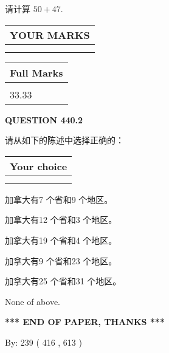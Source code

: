 \documentclass{ctexart}
\begin{document}
  
 
请计算 $ %
50 +  %
47 $.
 

 

 
  
\vspace{0.2in}
  
\noindent\begin{tabular}{|l|}
\hline
 YOUR MARKS  \\
\hline
 \\ 
 \\ 
\hline
\end{tabular}
\hspace{0.05in} \begin{tabular}{|l|}
\hline
 Full Marks  \\
\hline
 \\ 
33.33 \\
\hline
\end{tabular}
{\textbf{\Large{QUESTION
440.2 
}}}
  
  
请从如下的陈述中选择正确的：
  
  
\noindent\hspace{3.0in} \begin{tabular}{|l|}
\hline
Your choice \\
\hline
 \\ 
 \\ 
\hline
\end{tabular}
  
  
 
 
加拿大有7 个省和9 个地区。
 
 
加拿大有12 个省和3 个地区。
 
 
加拿大有19 个省和4 个地区。
 
 
加拿大有9 个省和23 个地区。
 
 
加拿大有25 个省和31 个地区。
 
 
 None of above.
 
 
   
   
 \vspace{0.2in}
 
   
   
   
   
\vspace{1.0in} 
{\textbf{\large{ *** END OF PAPER, THANKS *** }}} 
   
   
\hspace{1.0in} By: 
 239 ( 416 ,  613 )
   
\end{document}
